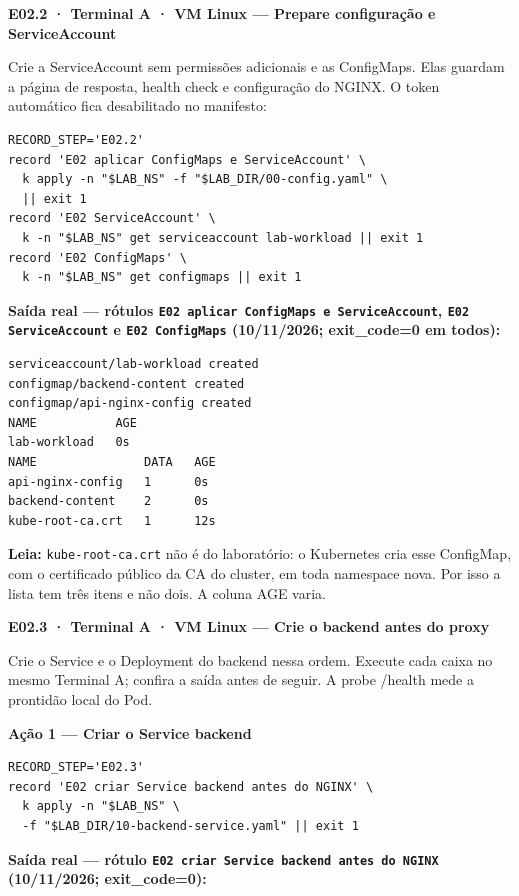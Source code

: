 \documentclass[12pt,openany,oneside,a4paper,chapter=TITLE,english,brazil]{abntex2}
\begin{document}
\textbf{E02.2 · Terminal A · VM Linux --- Prepare configuração e ServiceAccount}

Crie a ServiceAccount sem permissões adicionais e as ConfigMaps. Elas guardam a página de resposta, health check e configuração do NGINX. O token automático fica desabilitado no manifesto:

\begin{verbatim}
RECORD_STEP='E02.2'
record 'E02 aplicar ConfigMaps e ServiceAccount' \
  k apply -n "$LAB_NS" -f "$LAB_DIR/00-config.yaml" \
  || exit 1
record 'E02 ServiceAccount' \
  k -n "$LAB_NS" get serviceaccount lab-workload || exit 1
record 'E02 ConfigMaps' \
  k -n "$LAB_NS" get configmaps || exit 1
\end{verbatim}

\textbf{Saída real --- rótulos \texttt{E02 aplicar Config\allowbreak{}Maps e Service\allowbreak{}Account}, \texttt{E02 Service\allowbreak{}Account} e \texttt{E02 Config\allowbreak{}Maps} (10/11/2026; exit\_code=0 em todos):}

\begin{verbatim}
serviceaccount/lab-workload created
configmap/backend-content created
configmap/api-nginx-config created
NAME           AGE
lab-workload   0s
NAME               DATA   AGE
api-nginx-config   1      0s
backend-content    2      0s
kube-root-ca.crt   1      12s
\end{verbatim}

\textbf{Leia:} \texttt{kube-{}\allowbreak{}root-{}\allowbreak{}ca.\allowbreak{}crt} não é do laboratório: o Kubernetes cria esse ConfigMap, com o certificado público da CA do cluster, em toda namespace nova. Por isso a lista tem três itens e não dois. A coluna AGE varia.

\clearpage

\textbf{E02.3 · Terminal A · VM Linux --- Crie o backend antes do proxy}

Crie o Service e o Deployment do backend nessa ordem. Execute cada caixa no mesmo Terminal A; confira a saída antes de seguir. A probe /health mede a prontidão local do Pod.

\textbf{Ação 1 --- Criar o Service backend}

\begin{verbatim}
RECORD_STEP='E02.3'
record 'E02 criar Service backend antes do NGINX' \
  k apply -n "$LAB_NS" \
  -f "$LAB_DIR/10-backend-service.yaml" || exit 1
\end{verbatim}

\textbf{Saída real --- rótulo \texttt{E02 criar Service backend antes do NGINX} (10/11/2026; exit\_code=0):}
\end{document}
